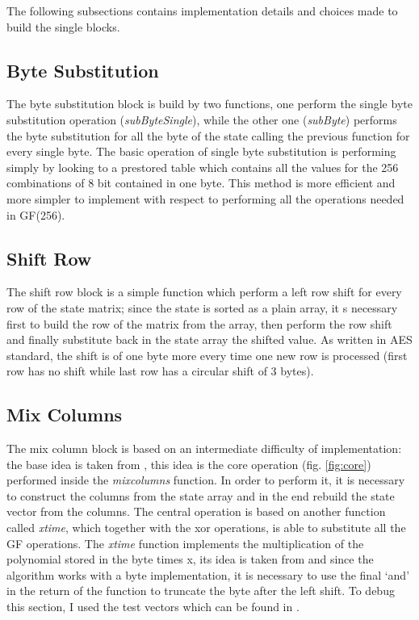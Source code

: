 \documentclass{article}
\begin{document}
The following subsections contains implementation details and choices made to build the single blocks.

\subsection{Byte Substitution}

The byte substitution block is build by two functions, one perform the single byte substitution operation (\textit {subByteSingle}), while the other one (\textit {subByte}) performs the byte substitution for all the byte of the state calling the previous function for every single byte. The basic operation of single byte substitution is performing simply by looking to a prestored table which contains all the values for the 256 combinations of 8 bit contained in one byte. This method is more efficient and more simpler to implement with respect to performing all the operations needed in GF(256).

\subsection{Shift Row}

The shift row block is a simple function which perform a left row shift for every row of the state matrix; since the state is sorted as a plain array, it s necessary first to build the row of the matrix from the array, then perform the row shift and finally substitute back in the state array the shifted value. As written in AES standard, the shift is of one byte more every time one new row is processed (first row has no shift while last row has a circular shift of 3 bytes). 

\subsection{Mix Columns}

The mix column block is based on an intermediate difficulty of implementation: the base idea is taken from \cite{10.5555/560131}, this idea is the core operation (fig. \ref{fig:core}) performed inside the \textit{mixcolumns} function. In order to perform it, it is necessary to construct the columns from the state array and in the end rebuild the state vector from the columns. The central operation is based on another function called \textit{xtime}, which together with the xor operations, is able to substitute all the GF operations. The \textit{xtime} function implements the multiplication of the polynomial stored in the byte times x, its idea is taken from \cite{AESxtime} and since the algorithm works with a byte implementation, it is necessary to use the final `and' in the return of the function to truncate the byte after the left shift. \newline
To debug this section, I used the test vectors which can be found in \cite{AESmixcolumn}.
\end{document}
